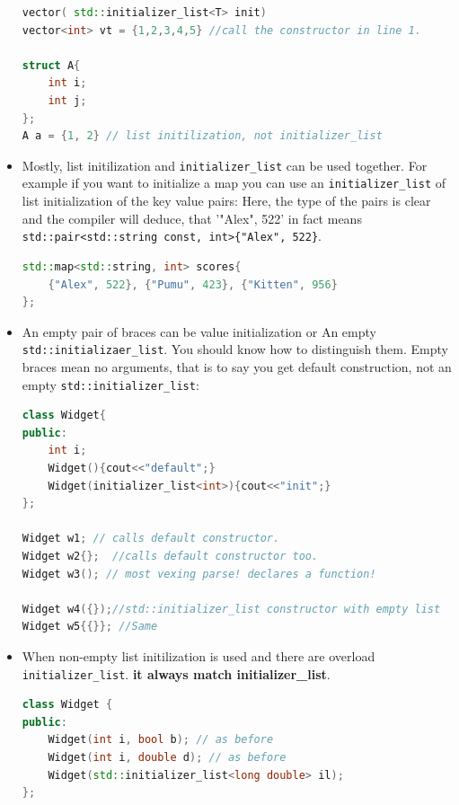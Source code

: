 \documentclass[a4paper,11pt,twoside]{book}
\begin{document}
\begin{itemize}
\begin{lstlisting}[frame=single, language=c++,mathescape=true]
vector( std::initializer_list<T> init)
vector<int> vt = {1,2,3,4,5} //call the constructor in line 1.
	
struct A{
	int i;
	int j;
};	
A a = {1, 2} // list initilization, not initializer_list
\end{lstlisting}
	
	\item Mostly, list initilization and \texttt{initializer\_list} can be used together. For example if you want to initialize a map you can use an \texttt{initializer\_list} of list initialization of the key value pairs: Here, the type of the pairs is clear and the compiler will deduce, that '{"Alex", 522}' in fact means \texttt{std::pair<std::string const, int>\{"Alex", 522\}}.
	
\begin{lstlisting}[frame=single, language=c++,mathescape=true]
std::map<std::string, int> scores{ 
	{"Alex", 522}, {"Pumu", 423}, {"Kitten", 956} 
};
\end{lstlisting}

	\item An empty pair of braces can be value initialization or An empty \texttt{std::initializaer\_list}. You should know how to distinguish them.  Empty braces mean no arguments, that is to say you get default construction, not an empty \texttt{std::initializer\_list}:
\begin{lstlisting}[frame=single, language=c++,mathescape=true]
class Widget{
public:
	int i;
	Widget(){cout<<"default";}
	Widget(initializer_list<int>){cout<<"init";}
};
	
Widget w1; // calls default constructor.
Widget w2{};  //calls default constructor too.
Widget w3(); // most vexing parse! declares a function!
	
Widget w4({});//std::initializer_list constructor with empty list 
Widget w5{{}}; //Same
\end{lstlisting}
	
	\item When non-empty list initilization is used and there are overload \texttt{initializer\_list}.
	\textbf{it always match initializer\_list}.
\begin{lstlisting}[frame=single, language=c++,mathescape=true]
class Widget {
public:
	Widget(int i, bool b); // as before
	Widget(int i, double d); // as before
	Widget(std::initializer_list<long double> il);
};
	

\end{lstlisting}
\end{itemize}
\end{document}
